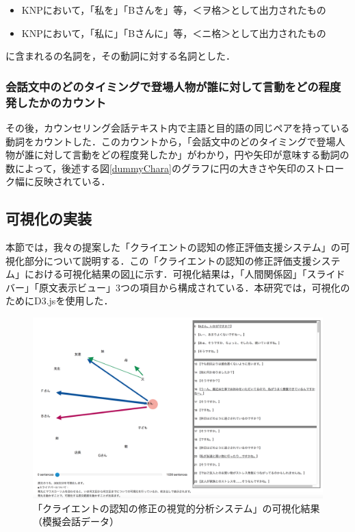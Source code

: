 \documentclass[shuuron]{kuee}
\begin{document}
\begin{itemize}

  \item KNPにおいて，「私を」「Bさんを」等，＜ヲ格＞として出力されたもの
  \item KNPにおいて，「私に」「Bさんに」等，＜ニ格＞として出力されたもの
\end{itemize}
に含まれるの名詞を，その動詞に対する名詞とした．

\subsubsection{会話文中のどのタイミングで登場人物が誰に対して言動をどの程度発したかのカウント}

その後，カウンセリング会話テキスト内で主語と目的語の同じペアを持っている動詞をカウントした．このカウントから，「会話文中のどのタイミングで登場人物が誰に対して言動をどの程度発したか」がわかり，円や矢印が意味する動詞の数によって，後述する図\ref{dummyChara}のグラフに円の大きさや矢印のストローク幅に反映されている．


\subsection{可視化の実装}

本節では，我々の提案した「クライエントの認知の修正評価支援システム」の可視化部分について説明する．この「クライエントの認知の修正評価支援システム」における可視化結果の図\ref{fig:dummyChara}に示す．可視化結果は，「人間関係図」「スライドバー」「原文表示ビュー」3つの項目から構成されている．本研究では，可視化のためにD3.js\cite{vand3}を使用した．%

\begin{figure}
  \begin{center}
    \includegraphics[width=\linewidth]{dummyChara.png}
  \end{center}
  \caption{「クライエントの認知の修正の視覚的分析システム」の可視化結果（模擬会話データ）}
  \label{fig:dummyChara}
\end{figure}
\end{document}
